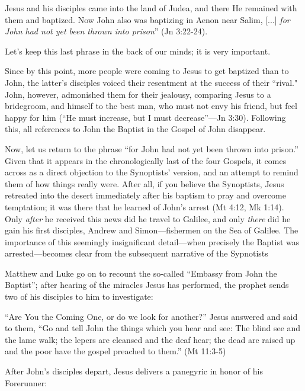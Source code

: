 \begin{smallquote}
    Jesus and his disciples came into the land of Judea, and there He remained with them and baptized. Now John also was baptizing in Aenon near Salim, [...] \emph{for John had not yet been thrown into prison}'' (Jn 3:22-24).
\end{smallquote}
Let's keep this last phrase in the back of our minds; it is very important.

Since by this point, more people were coming to Jesus to get baptized than
to John, the latter's disciples voiced their resentment at the success of their ``rival." John, however, admonished them for their jealousy, comparing Jesus to a bridegroom, and himself to the best man, who must not envy his friend, but feel happy for him (``He must increase, but I must decrease''---Jn 3:30). Following this, all references to John the Baptist in the Gospel of John disappear.

Now, let us return to the phrase ``for John had not yet been thrown into prison.'' Given that it appears in the chronologically last of the four Gospels, it comes across as a direct objection to the Synoptists' version, and an attempt to remind them of how things really were. After all, if you believe the Synoptists, Jesus retreated into the desert immediately after his baptism to pray and overcome temptation; it was there that he learned of John's arrest (Mt 4:12, Mk 1:14). Only \emph{after} he received this news did he travel to Galilee, and only \emph{there} did he gain his first disciples, Andrew and Simon---fishermen on the Sea of Galilee. The importance of this seemingly insignificant detail---when precisely the Baptist was arrested---becomes clear from the subsequent narrative of the Sypnotists

Matthew and Luke go on to recount the so-called ``Embassy from John the Baptist''; after hearing of the miracles Jesus has performed, the prophet sends two of his disciples to him to investigate:

\begin{smallquote}
    ``Are You the Coming One, or do we look for another?'' Jesus answered and said to them, ``Go and tell John the things which you hear and see: The blind see and the lame walk; the lepers are cleansed and the deaf hear; the dead are raised up and the poor have the gospel preached to them.'' (Mt 11:3-5)
\end{smallquote}
After John's disciples depart, Jesus delivers a panegyric in honor of his Forerunner:

